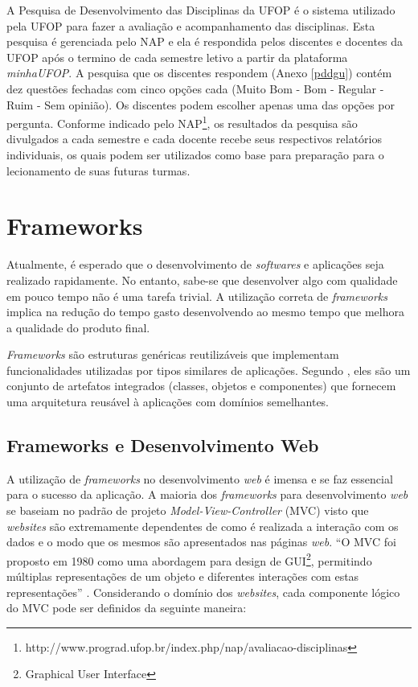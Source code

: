 \documentclass[
  12pt,       %
  openright,      %
  oneside,      %
  a4paper,      %
  english,      %
  french,        %
  spanish,     %
  brazil        %
  ]{abntex2-decsi}
\begin{document}
        A Pesquisa de Desenvolvimento das Disciplinas da UFOP é o sistema utilizado pela UFOP para fazer a avaliação e acompanhamento das disciplinas. Esta pesquisa é gerenciada pelo NAP e ela é respondida pelos discentes e docentes da UFOP após o termino de cada semestre letivo a partir da plataforma \textit{minhaUFOP}. A pesquisa que os discentes respondem (Anexo \ref{pddgu}) contém dez questões fechadas com cinco opções cada (Muito Bom - Bom - Regular - Ruim - Sem opinião). Os discentes podem escolher apenas uma das opções por pergunta. Conforme indicado pelo NAP\footnote{http://www.prograd.ufop.br/index.php/nap/avaliacao-disciplinas}, os resultados da pesquisa são divulgados a cada semestre e cada docente recebe seus respectivos relatórios individuais, os quais podem ser utilizados como base para preparação para o lecionamento de suas futuras turmas.

    \section{Frameworks}

        Atualmente, é esperado que o desenvolvimento de \textit{softwares} e aplicações seja realizado rapidamente. No entanto, sabe-se que desenvolver algo com qualidade em pouco tempo não é uma tarefa trivial. A utilização correta de \textit{frameworks} implica na redução do tempo gasto desenvolvendo ao mesmo tempo que melhora a qualidade do produto final.

        \textit{Frameworks} são estruturas genéricas reutilizáveis que implementam funcionalidades utilizadas por tipos similares de aplicações. Segundo , eles são um conjunto de artefatos integrados (classes, objetos e componentes) que fornecem uma arquitetura reusável à aplicações com domínios semelhantes.

        \subsection{Frameworks e Desenvolvimento Web}

            A utilização de \textit{frameworks} no desenvolvimento \textit{web} é imensa e se faz essencial para o sucesso da aplicação. A maioria dos \textit{frameworks} para desenvolvimento \textit{web} se baseiam no padrão de projeto \textit{Model-View-Controller} (MVC) visto que \textit{websites} são extremamente dependentes de como é realizada a interação com os dados e o modo que os mesmos são apresentados nas páginas \textit{web}. ``O MVC foi proposto em 1980 como uma abordagem para design de GUI\footnote{Graphical User Interface}, permitindo múltiplas representações de um objeto e diferentes interações com estas representações'' \cite[p. 432, tradução nossa]{sommervile:2011}. Considerando o domínio dos \textit{websites}, cada componente lógico do MVC pode ser definidos da seguinte maneira:
\end{document}
